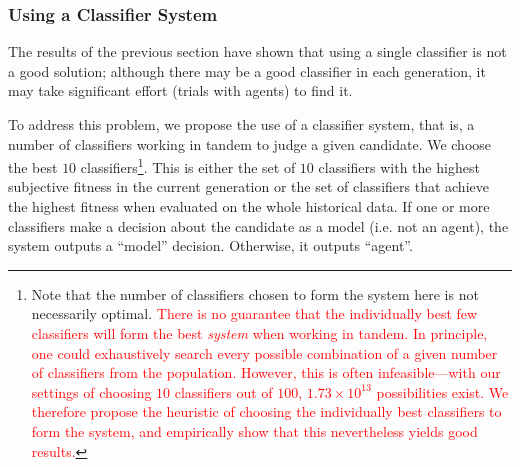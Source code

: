 \subsubsection{Using a Classifier System}

The results of the previous section have shown that using a single classifier is not a good solution; although there may be a good classifier in each generation, it may take significant effort (trials with agents) to find it.

To address this problem, we propose the use of a classifier system, that is, a number of classifiers working in tandem to judge a given candidate. We choose the best $10$ classifiers\footnote{Note that the number of classifiers chosen to form the system here is not necessarily optimal. \textcolor{red}{There is no guarantee that the individually best few classifiers will form the best \emph{system} when working in tandem. In principle, one could exhaustively search every possible combination of a given number of classifiers from the population. However, this is often infeasible---with our settings of choosing $10$ classifiers out of $100$, $1.73\times 10^{13}$ possibilities exist. We therefore propose the heuristic of choosing the individually best classifiers to form the system, and empirically show that this nevertheless yields good results.}}. This is either the set of $10$ classifiers with the highest subjective fitness in the current generation or the set of classifiers that achieve the highest fitness when evaluated on the whole historical data. If one or more classifiers make a decision about the candidate as a model (i.e. not an agent), the system outputs a ``model'' decision. Otherwise, it outputs ``agent''.

